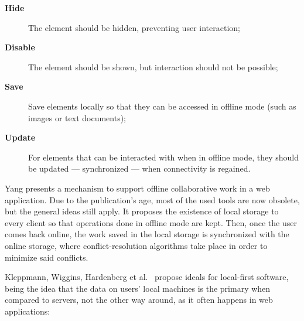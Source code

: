 \begin{description}
    \item[\textbf{Hide}] The element should be hidden, preventing user interaction;
    \item[\textbf{Disable}] The element should be shown, but interaction should not be possible;
    \item[\textbf{Save}] Save elements locally so that they can be accessed in offline mode (such as images or text documents);
    \item[\textbf{Update}] For elements that can be interacted with when in offline mode, they should be updated --- synchronized --- when connectivity is regained.
\end{description}

Yang \cite{Yang2000} presents a mechanism to support offline collaborative work in a web application. Due to the publication's age, most of the used tools are now obsolete, but the general ideas still apply. It proposes the existence of local storage to every client so that operations done in offline mode are kept. Then, once the user comes back online, the work saved in the local storage is synchronized with the online storage, where conflict-resolution algorithms take place in order to minimize said conflicts.

Kleppmann, Wiggins, Hardenberg et al.\ \cite{Kleppmann2019} propose ideals for local-first software, being the idea that the data on users' local machines is the primary when compared to servers, not the other way around, as it often happens in web applications:

